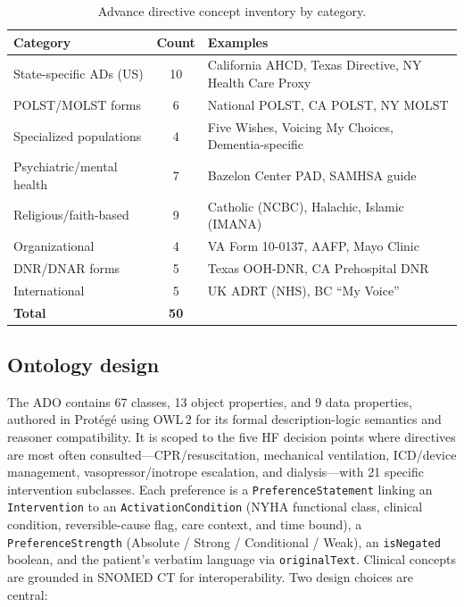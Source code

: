 \documentclass[10pt]{article}
\newcommand{\onto}[1]{\texttt{\small #1}}
\begin{document}
\begin{table}[ht]
\centering
\caption{Advance directive concept inventory by category.}
\label{tab:inventory}
\small
\begin{tabularx}{0.95\textwidth}{Xc>{\raggedright\arraybackslash}X}
\toprule
\textbf{Category} & \textbf{Count} & \textbf{Examples} \\
\midrule
State-specific ADs (US) & 10 & California AHCD, Texas Directive, NY Health Care Proxy \\
POLST/MOLST forms & 6 & National POLST, CA POLST, NY MOLST \\
Specialized populations & 4 & Five Wishes, Voicing My Choices, Dementia-specific \\
Psychiatric/mental health & 7 & Bazelon Center PAD, SAMHSA guide \\
Religious/faith-based & 9 & Catholic (NCBC), Halachic, Islamic (IMANA) \\
Organizational & 4 & VA Form 10-0137, AAFP, Mayo Clinic \\
DNR/DNAR forms & 5 & Texas OOH-DNR, CA Prehospital DNR \\
International & 5 & UK ADRT (NHS), BC ``My Voice'' \\
\midrule
\textbf{Total} & \textbf{50} & \\
\bottomrule
\end{tabularx}
\end{table}

\subsection{Ontology design}
The ADO contains 67 classes, 13 object properties, and 9 data properties, authored in Prot\'eg\'e\cite{protege} using OWL\,2\cite{owl2primer} for its formal description-logic semantics and reasoner compatibility. It is scoped to the five HF decision points where directives are most often consulted---CPR/resuscitation, mechanical ventilation, ICD/device management, vasopressor/inotrope escalation, and dialysis---with 21 specific intervention subclasses. Each preference is a \onto{PreferenceStatement} linking an \onto{Intervention} to an \onto{ActivationCondition} (NYHA functional class,\cite{nyha} clinical condition, reversible-cause flag, care context, and time bound), a \onto{PreferenceStrength} (Absolute / Strong / Conditional / Weak), an \onto{isNegated} boolean, and the patient's verbatim language via \onto{originalText}. Clinical concepts are grounded in SNOMED CT\cite{snomedct} for interoperability. Two design choices are central:
\end{document}
